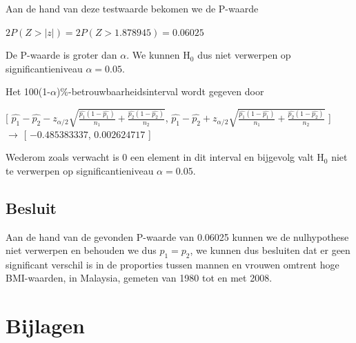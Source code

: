 \documentclass[11pt]{article}
\begin{document}
Aan de hand van deze testwaarde bekomen we de P-waarde

\begin{center}
$2P(Z>|z|) = 2P(Z > 1.878945) = 0.06025$ 
\end{center}

De P-waarde is groter dan $\alpha$. We kunnen H$_{0}$ dus niet verwerpen op significantieniveau $\alpha = 0.05$.

Het 100(1-$\alpha$)\%-betrouwbaarheidsinterval wordt gegeven door

\begin{center}
[ $\hat{p_{1}}-\hat{p_{2}}-z_{\alpha/2}\sqrt{\frac{\hat{p_{1}}(1-\hat{p_{1}})}{n_{1}}+\frac{\hat{p_{2}}(1-\hat{p_{2}})}{n_{2}}}$, $\hat{p_{1}}-\hat{p_{2}}+z_{\alpha/2}\sqrt{\frac{\hat{p_{1}}(1-\hat{p_{1}})}{n_{1}}+\frac{\hat{p_{2}}(1-\hat{p_{2}})}{n_{2}}}$ ]\\
$\longrightarrow$
[ $-0.485383337$,  $0.002624717$ ]
\end{center}

Wederom zoals verwacht is 0 een element in dit interval en bijgevolg valt H$_{0}$ niet te verwerpen op significantieniveau $\alpha=0.05$.

\subsection{Besluit}
Aan de hand van de gevonden P-waarde van 0.06025 kunnen we de nulhypothese niet verwerpen en behouden we dus $p_{1} = p_{2}$, we kunnen dus besluiten dat er geen significant verschil is in de proporties tussen mannen en vrouwen omtrent hoge BMI-waarden, in Malaysia, gemeten van 1980 tot en met 2008.

\newpage
\section*{Bijlagen}


\end{document}
